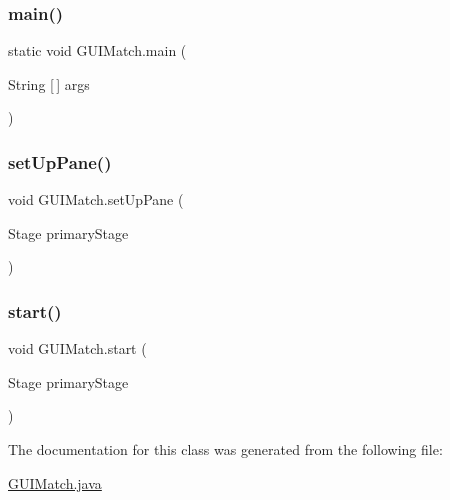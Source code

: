 \subsubsection{\texorpdfstring{main()}{main()}}
{\footnotesize\ttfamily static void G\+U\+I\+Match.\+main (\begin{DoxyParamCaption}\item[{String \mbox{[}$\,$\mbox{]}}]{args }\end{DoxyParamCaption})\hspace{0.3cm}{\ttfamily [static]}}

\mbox{\label{class_g_u_i_match_aa9f4fe916a6de3e9968e6eab465eb6e7}} 
\subsubsection{\texorpdfstring{set\+Up\+Pane()}{setUpPane()}}
{\footnotesize\ttfamily void G\+U\+I\+Match.\+set\+Up\+Pane (\begin{DoxyParamCaption}\item[{Stage}]{primary\+Stage }\end{DoxyParamCaption})}

\mbox{\label{class_g_u_i_match_a286efdec3789581a2892444cb193fe00}} 
\subsubsection{\texorpdfstring{start()}{start()}}
{\footnotesize\ttfamily void G\+U\+I\+Match.\+start (\begin{DoxyParamCaption}\item[{Stage}]{primary\+Stage }\end{DoxyParamCaption})}



The documentation for this class was generated from the following file\+:\begin{DoxyCompactItemize}
\item 
\mbox{\hyperlink{_g_u_i_match_8java}{G\+U\+I\+Match.\+java}}\end{DoxyCompactItemize}
